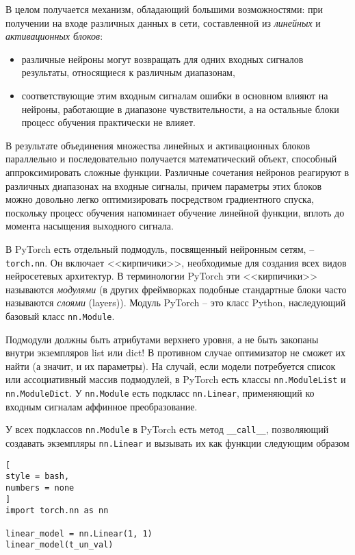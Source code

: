 \documentclass[%
	11pt,
	a4paper,
	utf8,
		]{article}
\begin{document}
В целом получается механизм, обладающий большими возможностями: при получении на входе различных данных в сети, составленной из \emph{линейных} и \emph{активационных блоков}:
\begin{itemize}
	\item различные нейроны могут возвращать для одних входных сигналов результаты, относящиеся к различным диапазонам,
	
	\item соответствующие этим входным сигналам ошибки в основном влияют на нейроны, работающие в диапазоне чувствительности, а на остальные блоки процесс обучения практически не влияет.
\end{itemize}

В результате объединения множества линейных и активационных блоков параллельно и последовательно получается математический объект, способный аппроксимировать сложные функции. Различные сочетания нейронов реагируют в различных диапазонах на входные сигналы, причем параметры этих блоков можно довольно легко оптимизировать посредством градиентного спуска, поскольку процесс обучения напоминает обучение линейной функции, вплоть до момента насыщения выходного сигнала.

В PyTorch есть отдельный подмодуль, посвященный нейронным сетям, -- \verb|torch.nn|. Он включает <<кирпичики>>, необходимые для создания всех видов нейросетевых архитектур. В терминологии PyTorch эти <<кирпичики>> называются \emph{модулями} (в других фреймворках подобные стандартные блоки часто называются \emph{слоями} (layers)). Модуль PyTorch -- это класс Python, наследующий базовый класс \verb|nn.Module|. 

Подмодули должны быть атрибутами верхнего уровня, а не быть закопаны внутри экземпляров list или dict! В противном случае оптимизатор не сможет их найти (а значит, и их параметры). На случай, если модели потребуется список или ассоциативный массив подмодулей, в PyTorch есть классы \verb|nn.ModuleList| и \verb|nn.ModuleDict|. У \verb|nn.Module| есть подкласс \verb|nn.Linear|, применяющий ко входным сигналам аффинное преобразование.

У всех подклассов \verb|nn.Module| в PyTorch есть метод \verb|__call__|, позволяющий создавать экземпляры \verb|nn.Linear| и вызывать их как функции следующим образом
\begin{lstlisting}[
style = bash,
numbers = none
]
import torch.nn as nn

linear_model = nn.Linear(1, 1)
linear_model(t_un_val)
\end{lstlisting}
\end{document}
